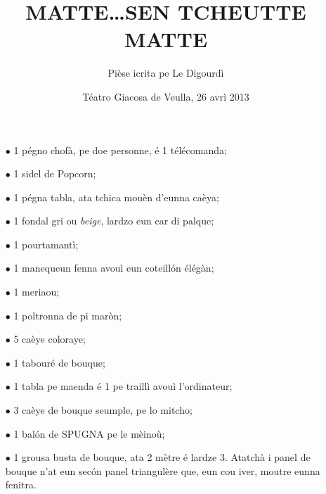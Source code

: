 \title{MATTE\ldots SEN TCHEUTTE MATTE}
\author{Pièse icrita pe Le Digourdì}
\date{Téatro Giacosa de Veulla, 26 avrì 2013}

\maketitle






\Scenographie
\begin{itemize}
\item[$\bullet$] 1 pégno chofà, pe doe personne, é 1 télécomanda;
\item[$\bullet$] 1 sidel de Popcorn;
\item[$\bullet$] 1 pégna tabla, ata tchica mouèn d'eunna caèya;
\item[$\bullet$] 1 fondal gri ou \textit{beige}, lardzo eun car di palque;
\item[$\bullet$] 1 pourtamantì;
\item[$\bullet$] 1 manequeun fenna avouì eun coteill\'on élégàn;
\item[$\bullet$] 1 meriaou;
\item[$\bullet$] 1 poltronna de pi maròn;
\item[$\bullet$] 5 caèye coloraye;
\item[$\bullet$] 1 tabouré de bouque;
\item[$\bullet$] 1 tabla pe maenda é 1 pe traillì avouì l'ordinateur;
\item[$\bullet$] 3 caèye de bouque seumple, pe lo mitcho;
\item[$\bullet$] 1 bal\'on de SPUGNA pe le mèinoù;
\item[$\bullet$] 1 grousa busta de bouque, ata 2 mètre é lardze 3. Atatchà i panel de bouque n'at eun sec\'on panel triangulère que, eun cou iver, moutre eunna fenitra.
\end{itemize}

\setlength{\lengthchar}{3.5cm}


